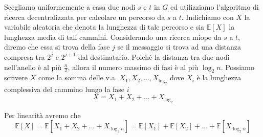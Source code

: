 \begin{osservazione}\label{oss:fasi}
    
Scegliamo uniformemente a casa due nodi $s$ e $t$ in $G$ ed utilizziamo l'algoritmo di ricerca decentralizzata per calcolare un percorso da $s$ a $t$. Indichiamo con $X$ la variabile aleatoria che denota la lunghezza di tale percorso e sia $\mathbb{E}[X]$ la lunghezza media di tali cammini.
Considerando una ricerca miope da $s$ a $t$, diremo che essa si trova della fase $j$ se il messaggio si trova ad una distanza compresa tra $2^j$ e $2^{j+1}$ dal destinatario. Poiché la distanza tra due nodi nell'anello è al più $\frac{n}{2}$, allora il numero massimo di fasi è al più $\log_2n$. Possiamo scrivere $X$ come la somma delle v.a. $X_1, X_2, \dots, X_{\log_2}$ dove $X_i$ è la lunghezza complessiva del cammino lungo la fase $i$
\[
X = X_1 + X_2 + \dots + X_{\log_2}
\]

Per linearità avremo che
\[
\mathbb{E}\left[ X \right] = \mathbb{E}\left[ X_1 + X_2 + ... + X_{\log_2{n}} \right] = \mathbb{E}\left[ X_1 \right] +  \mathbb{E}\left[ X_2 \right] + ... +  \mathbb{E}\left[ X_{\log_2{n}} \right]
\]
\end{osservazione}

